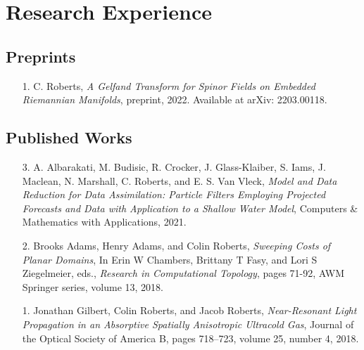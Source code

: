 \documentclass[12pt]{article} %
\begin{document}




\section{Research Experience}
\subsection{Preprints}
\begin{itemize}[leftmargin=*]
    \item[1.] C. Roberts, \textit{A Gelfand Transform for Spinor Fields on Embedded Riemannian Manifolds}, preprint, 2022. Available at arXiv: 2203.00118.
\end{itemize}
\subsection{Published Works}
\begin{flushleft}
\begin{itemize}[leftmargin=*]
    \item[3.] A. Albarakati, M. Budisic, R. Crocker, J. Glass-Klaiber, S. Iams, J. Maclean, N. Marshall, C. Roberts,
and E. S. Van Vleck, \textit{Model and Data Reduction for Data Assimilation: Particle Filters Employing
Projected Forecasts and Data with Application to a Shallow Water Model}, Computers \& Mathematics with Applications, 2021.

    \item[2.] Brooks Adams, Henry Adams, and Colin Roberts, \textit{Sweeping Costs of Planar Domains}, In Erin W Chambers, Brittany T Fasy, and Lori S Ziegelmeier, eds., \emph{Research in Computational Topology}, pages 71-92, AWM Springer series, volume 13, 2018.

    \item[1.] Jonathan Gilbert, Colin Roberts, and Jacob Roberts, \textit{Near-Resonant Light Propagation in an Absorptive Spatially Anisotropic Ultracold Gas}, Journal of the Optical Society of America B, pages 718–723, volume 25, number 4, 2018.
\end{itemize}
\end{flushleft}
\end{document}
